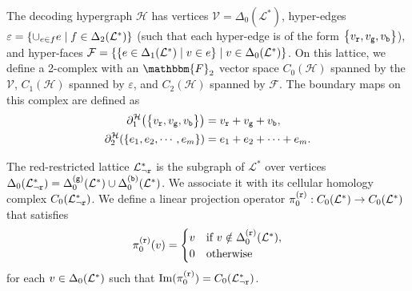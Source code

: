 \documentclass[a4paper,twocolumn,11pt,accepted=2025-01-21]{quantumarticle}
\theoremstyle{definition}
\theoremstyle{definition}
\theoremstyle{definition}
\begin{document}
The decoding hypergraph $\mathcal{H}$ has vertices $\mathcal{V} = \Delta_0 (\mathcal{L}^*)$, hyper-edges $\varepsilon = \qty{ \cup_{e \in f} e \; \vert \; f \in \Delta_2 (\mathcal{L}^*) }$ (such that each hyper-edge is of the form $\qty{v_\rbs,v_\gbs,v_\bbs}$), and hyper-faces $\mathcal{F} = \qty{ \qty{e \in \Delta_1 (\mathcal{L}^*) \;\vert\; v \in e} \;\vert\; v \in \Delta_0(\mathcal{L}^*)}$. 
On this lattice, we define a 2-complex with an $\mathbbm{F}_2$ vector space $C_0(\mathcal{H})$ spanned by the $\mathcal{V}$, $C_1(\mathcal{H})$ spanned by $\varepsilon$, and $C_2(\mathcal{H})$ spanned by $\mathcal{F}$. The boundary maps on this complex are defined as
\begin{align*}
    \partial_1^\mathcal{H} \qty(\qty{v_\rbs,v_\gbs,v_\bbs}) &= v_\rbs+v_\gbs+v_\bbs, \\
    \partial_2^\mathcal{H} \qty(\qty{e_1,e_2, \cdots, e_m}) &= e_1+e_2 + \cdots + e_m.
\end{align*}

The red-restricted lattice $\LatticeRest{\rbs}$ is the subgraph of $\mathcal{L}^*$ over vertices $\Delta_0(\LatticeRest{\rbs}) = \latelmcolor{\mathcal{L}^*}{0}{\gbs} \cup \latelmcolor{\mathcal{L}^*}{0}{\bbs}$. 
We associate it with its cellular homology complex $C_0(\LatticeRest{\rbs})$. 
We define a linear projection operator $\pi_0^{(\rbs)}: C_0(\mathcal{L}^*) \rightarrow C_0(\mathcal{L}^*)$ that satisfies
\begin{align*}
\pi_0^{(\rbs)}(v) = \begin{cases} 
      v & \text{if } v \notin \latelmcolor{\mathcal{L}^*}{0}{\rbs}, \\
      0 & \text{otherwise}
   \end{cases}
\end{align*}
for each $v \in \latelm{\mathcal{L}^*}{0}$ such that $\Im(\pi_0^{(\rbs)}) = C_0(\LatticeRest{\rbs})$.
\end{document}
